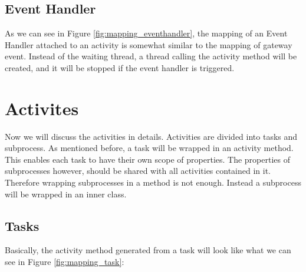\subsection{Event Handler}
As we can see in Figure \ref{fig:mapping_eventhandler}, the mapping of an Event Handler attached to an activity is somewhat similar to the mapping of gateway event. Instead of the waiting thread, a thread calling the activity method will be created, and it will be stopped if the event handler is triggered.\\

\newpage
\section{Activites}
Now we will discuss the activities in details. Activities are divided into tasks and subprocess. As mentioned before, a task will be wrapped in an activity method. This enables each task to have their own scope of properties. The properties of subprocesses however, should be shared with all activities contained in it. Therefore wrapping subprocesses in a method is not enough. Instead a subprocess will be wrapped in an inner class.
 
\subsection{Tasks}
Basically, the activity method generated from a task will look like what we can see in Figure \ref{fig:mapping_task}:

